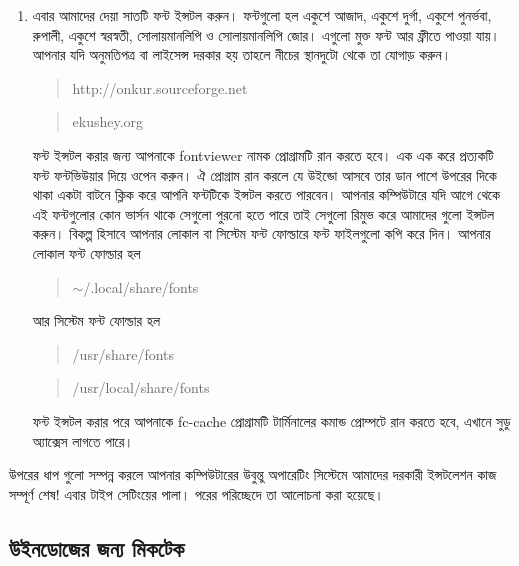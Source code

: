 \begin{enumerate}
\item এবার আমাদের দেয়া সাতটি ফন্ট ইন্সটল করুন। ফন্টগুলো হল একুশে আজাদ, একুশে দুর্গা, একুশে পুনর্ভবা, রুপালী, একুশে স্বরস্বতী, সোলায়মানলিপি ও সোলায়মানলিপি জোর। এগুলো মুক্ত ফন্ট আর ফ্রীতে পাওয়া যায়। আপনার যদি অনুমতিপত্র বা লাইসেন্স দরকার হয় তাহলে নীচের স্থানদুটো থেকে তা যোগাড় করুন। ‌\begin{quote}http://onkur.sourceforge.net\end{quote}\begin{quote}ekushey.org\end{quote} ফন্ট ইন্সটল করার জন্য আপনাকে fontviewer নামক প্রোগ্রামটি রান করতে হবে। এক এক করে প্রত্যকটি ফন্ট ফন্টভিউয়ার দিয়ে ওপেন করুন। ঐ প্রোগ্রাম রান করলে যে উইন্ডো আসবে তার ডান পাশে উপরের দিকে থাকা একটা বাটনে ক্লিক করে আপনি ফন্টটিকে ইন্সটল করতে পারবেন। আপনার কম্পিউটারে যদি আগে থেকে এই ফন্টগুলোর কোন ভার্সন থাকে সেগুলো পুরনো হতে পারে তাই সেগুলো রিমুভ করে আমাদের গুলো ইন্সটল করুন। বিকল্প হিসাবে আপনার লোকাল বা সিস্টেম ফন্ট ফোল্ডারে ফন্ট ফাইলগুলো কপি করে দিন। আপনার লোকাল ফন্ট ফোল্ডার হল  ‌\begin{quote}$\sim$/.local/share/fonts \end{quote} আর সিস্টেম ফন্ট ফোল্ডার হল ‌\begin{quote}/usr/share/fonts\end{quote} \begin{quote}/usr/local/share/fonts\end{quote} ফন্ট ইন্সটল করার পরে আপনাকে fc-cache প্রোগ্রামটি টার্মিনালের কমান্ড প্রোম্পটে রান করতে হবে, এখানে সুডু অ্যাক্সেস লাগতে পারে।
\end{enumerate}

উপরের ধাপ গুলো সম্পন্ন করলে আপনার কম্পিউটারের উবুন্তু অপারেটিং সিস্টেমে আমাদের দরকারী ইন্সটলেশন কাজ সম্পূর্ণ শেষ! এবার টাইপ সেটিংয়ের পালা। পরের পরিচ্ছেদে তা আলোচনা করা হয়েছে।

\subsection{উইনডোজের জন্য মিকটেক}

